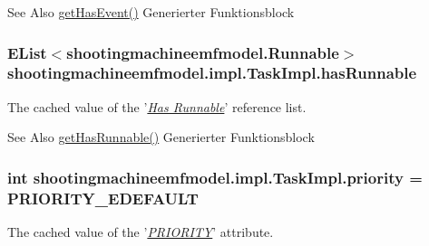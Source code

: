 \begin{DoxySeeAlso}{See Also}
\hyperlink{classshootingmachineemfmodel_1_1impl_1_1_task_impl_a7a7f8af008aa5bb195e34d29cfb0f982}{get\-Has\-Event()} Generierter Funktionsblock  
\end{DoxySeeAlso}
\hypertarget{classshootingmachineemfmodel_1_1impl_1_1_task_impl_ab64e4bc56b206c3a4df9ea8dcf3cc2c9}{
\subsubsection[{has\-Runnable}]{\setlength{\rightskip}{0pt plus 5cm}E\-List$<${\bf shootingmachineemfmodel.\-Runnable}$>$ shootingmachineemfmodel.\-impl.\-Task\-Impl.\-has\-Runnable\hspace{0.3cm}{\ttfamily [protected]}}}\label{classshootingmachineemfmodel_1_1impl_1_1_task_impl_ab64e4bc56b206c3a4df9ea8dcf3cc2c9}
The cached value of the '\hyperlink{classshootingmachineemfmodel_1_1impl_1_1_task_impl_a0d2049f4d0efcb7d3dea6f88429a3674}{{\itshape Has Runnable}}' reference list.

\begin{DoxySeeAlso}{See Also}
\hyperlink{classshootingmachineemfmodel_1_1impl_1_1_task_impl_a0d2049f4d0efcb7d3dea6f88429a3674}{get\-Has\-Runnable()} Generierter Funktionsblock  
\end{DoxySeeAlso}
\hypertarget{classshootingmachineemfmodel_1_1impl_1_1_task_impl_ad56bbc62c27ba87c3f2918e3dc2c4227}{
\subsubsection[{priority}]{\setlength{\rightskip}{0pt plus 5cm}int shootingmachineemfmodel.\-impl.\-Task\-Impl.\-priority = {\bf P\-R\-I\-O\-R\-I\-T\-Y\-\_\-\-E\-D\-E\-F\-A\-U\-L\-T}\hspace{0.3cm}{\ttfamily [protected]}}}\label{classshootingmachineemfmodel_1_1impl_1_1_task_impl_ad56bbc62c27ba87c3f2918e3dc2c4227}
The cached value of the '\hyperlink{classshootingmachineemfmodel_1_1impl_1_1_task_impl_afbc32e6264af20e59fee3c02b3a192fb}{{\itshape P\-R\-I\-O\-R\-I\-T\-Y}}' attribute.

